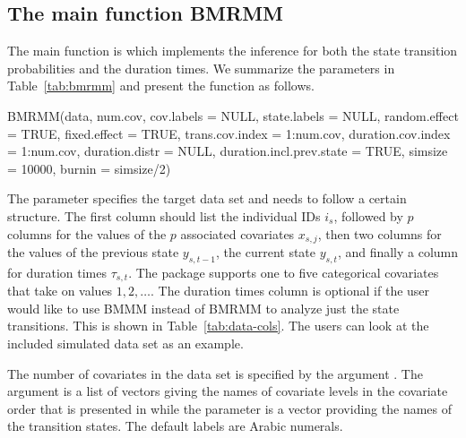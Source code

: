 \subsection{The main function BMRMM}

The main function is  which implements the inference for both the state transition probabilities and the {duration times}. We summarize the parameters  in Table~\ref{tab:bmrmm} and present the function as follows.

\begin{example}
BMRMM(data, num.cov, cov.labels = NULL, state.labels = NULL, 
      random.effect = TRUE, fixed.effect = TRUE, 
      trans.cov.index = 1:num.cov, duration.cov.index = 1:num.cov, 
      duration.distr = NULL, duration.incl.prev.state = TRUE,
      simsize = 10000, burnin = simsize/2)
\end{example}

The parameter  specifies the target data set and  needs to follow a certain structure.  
The first column should list the individual IDs $i_{s}$, followed by $p$ columns for the values of the $p$ associated covariates $x_{s,j}$, 
then two columns for the values of the previous state $y_{s,t-1}$, the current state $y_{s,t}$, and finally a column for {duration times} $\tau_{s,t}$.
{The package supports {one to five} categorical covariates that take on values ${1,2,\dots}$.} 
The {duration times} column is optional if the user would like to use BMMM instead of BMRMM to analyze just the state transitions.
This is shown in Table~\ref{tab:data-cols}.  
The users can look at the included simulated data set   as an example.

\begin{table}[h]
    \centering
    \caption{Columns of the desired input data set.}
    \label{tab:data-cols}
\end{table}

The number of covariates in the data set is specified by the argument .
The argument  is a list of vectors giving the names of covariate levels in the covariate order that is presented in  while the parameter  is a  vector providing the names of the transition states. 
The default labels are Arabic numerals.
 
